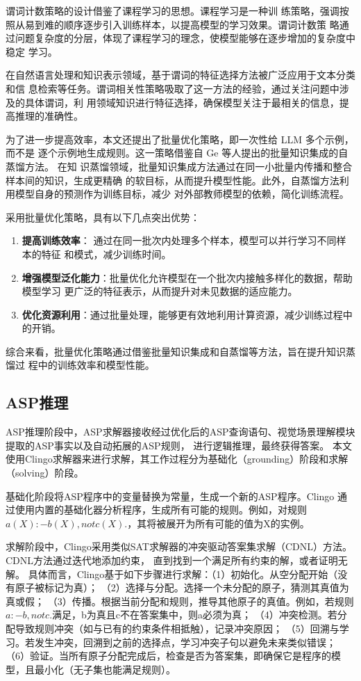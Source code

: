 谓词计数策略的设计借鉴了课程学习的思想。课程学习是一种训
练策略，强调按照从易到难的顺序逐步引入训练样本，以提高模型的学习效果。谓词计数策
略通过问题复杂度的分层，体现了课程学习的理念，使模型能够在逐步增加的复杂度中稳定
学习。

在自然语言处理和知识表示领域，基于谓词的特征选择方法被广泛应用于文本分类和信
息检索等任务。谓词相关性策略吸取了这一方法的经验，通过关注问题中涉及的具体谓词，利
用领域知识进行特征选择，确保模型关注于最相关的信息，提高推理的准确性。

为了进一步提高效率，本文还提出了批量优化策略，即一次性给 LLM 多个示例，而不是
逐个示例地生成规则。这一策略借鉴自 Ge\cite{ge2021selfdistillationbatchknowledgeensembling} 等人提出的批量知识集成的自蒸馏方法。 在知
识蒸馏领域，批量知识集成方法通过在同一小批量内传播和整合样本间的知识，生成更精确
的软目标，从而提升模型性能。此外，自蒸馏方法利用模型自身的预测作为训练目标，减少
对外部教师模型的依赖，简化训练流程。

采用批量优化策略，具有以下几点突出优势：
\begin{enumerate}[nosep]
\item \textbf{提高训练效率}： 通过在同一批次内处理多个样本，模型可以并行学习不同样本的特征
和模式，减少训练时间。
\item \textbf{增强模型泛化能力}：批量优化允许模型在一个批次内接触多样化的数据，帮助模型学习
更广泛的特征表示，从而提升对未见数据的适应能力。
\item \textbf{优化资源利用}：通过批量处理，能够更有效地利用计算资源，减少训练过程中的开销。
\end{enumerate}

综合来看，批量优化策略通过借鉴批量知识集成和自蒸馏等方法，旨在提升知识蒸馏过
程中的训练效率和模型性能。
\subsection{ASP推理}
ASP推理阶段中，ASP求解器接收经过优化后的ASP查询语句、视觉场景理解模块提取的ASP事实以及自动拓展的ASP规则，
进行逻辑推理，最终获得答案。
本文使用Clingo求解器来进行求解，其工作过程分为基础化（grounding）阶段和求解（solving）阶段。

基础化阶段将ASP程序中的变量替换为常量，生成一个新的ASP程序。Clingo
通过使用内置的基础化器分析程序，生成所有可能的规则。例如，对规则
$a(X) :- b(X), not c(X).$，其将被展开为所有可能的值为X的实例。

求解阶段中，Clingo采用类似SAT求解器的冲突驱动答案集求解（CDNL）方法。CDNL方法通过迭代地添加约束，
直到找到一个满足所有约束的解，或者证明无解。
具体而言，Clingo基于如下步骤进行求解：（1）初始化。从空分配开始（没有原子被标记为真）；
（2）选择与分配。选择一个未分配的原子，猜测其真值为真或假；
（3）传播。根据当前分配和规则，推导其他原子的真值。例如，若规则$a :- b, not c.$满足，b为真且c不在答案集中，则a必须为真；
（4）冲突检测。若分配导致规则冲突（如与已有的约束条件相抵触），记录冲突原因；
（5）回溯与学习。若发生冲突，回溯到之前的选择点，学习冲突子句以避免未来类似错误；
（6）验证。当所有原子分配完成后，检查是否为答案集，即确保它是程序的模型，且最小化（无子集也能满足规则）。

